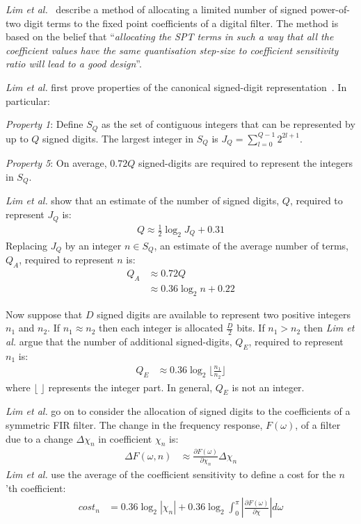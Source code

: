 \documentclass[a4paper,twoside,10pt,english]{article}
\begin{document}
\emph{Lim et al.}~\cite{Lim_SignedPowerOfTwoAllocationDigitalFilters} describe
a method of allocating  a limited number of signed power-of-two digit terms 
to the fixed point coefficients of a digital filter. The method is based 
on the belief that ``\emph{allocating the SPT terms in such a way that all the 
coefficient values have the same quantisation step-size to coefficient
sensitivity ratio will lead to a good design}''. 

\emph{Lim et al.} first prove properties of the canonical signed-digit
representation~\cite[Section II]{Lim_SignedPowerOfTwoAllocationDigitalFilters}.
In particular:

\emph{Property 1}: Define $S_{Q}$ as the set of contiguous integers that can be 
represented by up to $Q$ signed digits. The largest integer in $S_{Q}$ is
$J_{Q}=\sum_{l=0}^{Q-1}2^{2l+1}$.

\emph{Property 5}: On average, $0.72Q$ signed-digits are required to represent
the integers in $S_{Q}$.

\emph{Lim et al.} show that an estimate of the number of signed digits, $Q$, 
required to represent $J_{Q}$ is:
\begin{align*}
  Q \approx \frac{1}{2}\log_{2}J_{Q}+0.31
\end{align*}
Replacing $J_{Q}$ by an integer $n\in S_{Q}$, an estimate of the average number
of terms, $Q_{A}$, required to represent $n$ is:
\begin{align*}
  Q_{A}&\approx 0.72Q\\
      &\approx 0.36 \log_{2}n+0.22
\end{align*}

Now suppose that $D$ signed digits are available to represent two positive
integers $n_{1}$ and $n_{2}$. If $n_{1}\approx n_{2}$ then each integer is
allocated $\frac{D}{2}$ bits. If $n_{1}>n_{2}$ then \emph{Lim et al.} argue 
that the number of additional signed-digits, $Q_{E}$, required to represent 
$n_{1}$ is:
\begin{align*}
  Q_{E}&\approx 0.36\log_{2}\lfloor \frac{n_{1}}{n_{2}}\rfloor
\end{align*}
where $\lfloor\;\rfloor$ represents the integer part. In general, 
$Q_{E}$ is not an integer.

\emph{Lim et al.} go on to consider the allocation of signed digits to the
coefficients of a symmetric FIR filter. The change in the frequency response,
$F\left(\omega\right)$, of a filter due to a change $\Delta\chi_{n}$ in
coefficient $\chi_{n}$ is:
\begin{align*}
\Delta{} F\left(\omega,n\right)&  \approx
\frac{\partial{}F\left(\omega\right)}{\partial\chi_{n}}\Delta{}\chi_{n}
\end{align*}
\emph{Lim et al.} use the average of the coefficient sensitivity to define a
cost for the $n$'th coefficient:
\begin{align*}
cost_{n}&=0.36\log_{2}\left|\chi_{n}\right| + 0.36\log_{2}\int^{\pi}_{0}
\left|\frac{\partial{}F\left(\omega\right)}{\partial{}\chi_{}}\right|d\omega
\end{align*}
\end{document}

